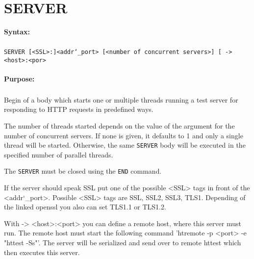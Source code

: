 
\newpage
\section{SERVER}
\label{cmd:SERVER}

\paragraph{Syntax:}
\subparagraph{}
\texttt{SERVER [<SSL>:]<addr\char`\_port> [<number of concurrent servers>] [ -> <host>:<por> }

\paragraph{Purpose:}
\subparagraph{}
Begin of a body which starts one or multiple threads running a test server for responding  
to HTTP requests in predefined ways.

The number of threads started depends on the value of the argument for 
the number of concurrent servers. If none is given, it defaults to 1 and 
only a single thread will be started. Otherwise, the same \texttt{SERVER} body will 
be executed in the specified number of parallel threads.

The \texttt{SERVER} must be closed using the \texttt{END} command.

If the server should speak SSL put one of the possible <SSL> tags in front of the <addr\char`\_port>. Possible <SSL> tags are SSL, SSL2, SSL3, TLS1. Depending of the linked openssl you also can set TLS1.1 or TLS1.2.

With -> <host>:<port> you can define a remote host, where this server must run. The remote host must start the following command 'htremote -p <port> -e "httest -Ss"'. The server will be serialized and send over to remote httest which then executes this server.

